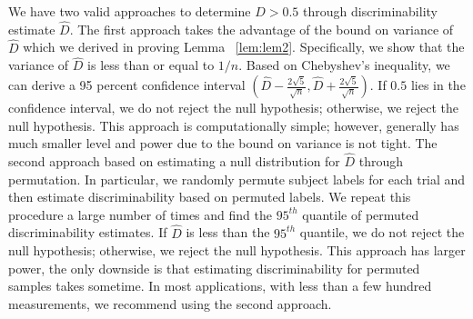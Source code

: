 \documentclass{article}
\begin{document}
We have two valid approaches to determine $D > 0.5$ through discriminability estimate $\hat{D}$. The first approach takes the advantage of the bound on variance of $\hat{D}$ which we derived in proving Lemma ~\ref{lem:lem2}. Specifically, we show that the variance of $\hat{D}$ is less than or equal to $1/n$. Based on Chebyshev's inequality, we can derive a 95 percent confidence interval $(\hat{D}-\frac{2\sqrt{5}}{\sqrt{n}},\hat{D}+\frac{2\sqrt{5}}{\sqrt{n}})$. If $0.5$ lies in the confidence interval, we do not reject the null hypothesis; otherwise, we reject the null hypothesis. This approach is computationally simple; however, generally has much smaller level and power due to the bound on variance is not tight. The second approach based on estimating a null distribution for $\hat{D}$ through permutation. In particular, we randomly permute subject labels for each trial and then estimate discriminability based on permuted labels. We repeat this procedure a large number of times and find the $95^{th}$ quantile of permuted discriminability estimates. If $\hat{D}$ is less than the $95^{th}$ quantile, we do not reject the null hypothesis; otherwise, we reject the null hypothesis. This approach has larger power, the only downside is that estimating discriminability for permuted samples takes sometime. In most applications, with less than a few hundred measurements, we recommend using the second approach. 
\end{document}
